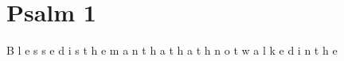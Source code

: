 \documentclass{article}%
\begin{document}
%
\normalsize%
\section{Psalm 1}%
\label{sec:Psalm1}%
B\newline%
%
l\newline%
%
e\newline%
%
s\newline%
%
s\newline%
%
e\newline%
%
d\newline%
%
 \newline%
%
i\newline%
%
s\newline%
%
 \newline%
%
t\newline%
%
h\newline%
%
e\newline%
%
 \newline%
%
m\newline%
%
a\newline%
%
n\newline%
%
 \newline%
%
t\newline%
%
h\newline%
%
a\newline%
%
t\newline%
%
 \newline%
%
h\newline%
%
a\newline%
%
t\newline%
%
h\newline%
%
 \newline%
%
n\newline%
%
o\newline%
%
t\newline%
%
 \newline%
%
w\newline%
%
a\newline%
%
l\newline%
%
k\newline%
%
e\newline%
%
d\newline%
%
 \newline%
%
i\newline%
%
n\newline%
%
 \newline%
%
t\newline%
%
h\newline%
%
e\newline%
\end{document}
